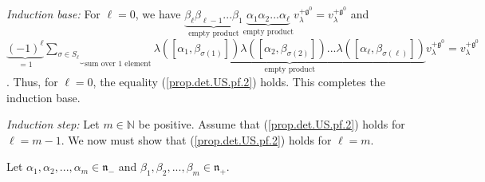 \documentclass
[numbers=enddot,12pt,final,onecolumn,german,notitlepage]{scrartcl}%
\theoremstyle{definition}
\begin{document}
\textit{Induction base:} For $\ell=0$, we have $\underbrace{\beta_{\ell}%
\beta_{\ell-1}...\beta_{1}}_{\text{empty product}}\underbrace{\alpha_{1}%
\alpha_{2}...\alpha_{\ell}}_{\text{empty product}}v_{\lambda}^{+\mathfrak{g}%
^{0}}=v_{\lambda}^{+\mathfrak{g}^{0}}$ and \newline$\underbrace{\left(
-1\right)  ^{\ell}}_{=1}\underbrace{\sum\limits_{\sigma\in S_{\ell}}%
}_{\text{sum over }1\text{ element}}\underbrace{\lambda\left(  \left[
\alpha_{1},\beta_{\sigma\left(  1\right)  }\right]  \right)  \lambda\left(
\left[  \alpha_{2},\beta_{\sigma\left(  2\right)  }\right]  \right)
...\lambda\left(  \left[  \alpha_{\ell},\beta_{\sigma\left(  \ell\right)
}\right]  \right)  }_{\text{empty product}}v_{\lambda}^{+\mathfrak{g}^{0}%
}=v_{\lambda}^{+\mathfrak{g}^{0}}$. Thus, for $\ell=0$, the equality
(\ref{prop.det.US.pf.2}) holds. This completes the induction base.

\textit{Induction step:} Let $m\in\mathbb{N}$ be positive. Assume that
(\ref{prop.det.US.pf.2}) holds for $\ell=m-1$. We now must show that
(\ref{prop.det.US.pf.2}) holds for $\ell=m$.

Let $\alpha_{1},\alpha_{2},...,\alpha_{m}\in\mathfrak{n}_{-}$ and $\beta
_{1},\beta_{2},...,\beta_{m}\in\mathfrak{n}_{+}$.
\end{document}
